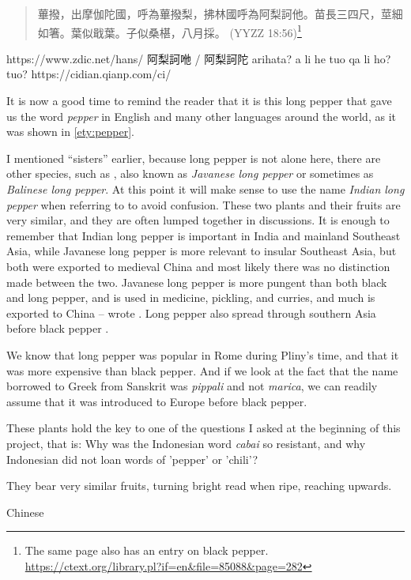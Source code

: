 \begin{quote}
    蓽撥，出摩伽陀國，呼為蓽撥梨，拂林國呼為阿梨訶他。苗長三四尺，莖細如箸。葉似戢葉。子似桑椹，八月採。 (YYZZ 18:56)\footnote{The same page also has an entry on black pepper. \url{https://ctext.org/library.pl?if=en&file=85088&page=282}}
\end{quote}

https://www.zdic.net/hans/%
阿梨訶咃 / 阿梨訶陀 arihata?
a li he tuo
qa li ho? tuo?
https://cidian.qianp.com/ci/%

It is now a good time to remind the reader that it is this long pepper that gave us the word \textit{pepper} in English and many other languages around the world, as it was shown in \ref{ety:pepper}. 

I mentioned ``sisters'' earlier, because long pepper is not alone here, there are other species, such as , also known as \textit{Javanese long pepper} or sometimes as \textit{Balinese long pepper}. At this point it will make sense to use the name \textit{Indian long pepper} when referring to  to avoid confusion. These two plants and their fruits are very similar, and they are often lumped together in discussions. It is enough to remember that Indian long pepper is important in India and mainland Southeast Asia, while Javanese long pepper is more relevant to insular Southeast Asia, but both were exported to medieval China and most likely there was no distinction made between the two. Javanese long pepper is more pungent than both black and long pepper, and is used in medicine, pickling, and curries, and much is exported to China -- wrote \textcite{burkill_dictionary_1935}. Long pepper also spread through southern Asia before black pepper \parencite[1746-1751]{burkill_dictionary_1935}. 

We know that long pepper was popular in Rome during Pliny's time, and that it was more expensive than black pepper. And if we look at the fact that the name borrowed to Greek from Sanskrit was \textit{pippali} and not \textit{marica}, we can readily assume that it was introduced to Europe before black pepper.

These plants hold the key to one of the questions I asked at the beginning of this project, that is: Why was the Indonesian word \textit{cabai} so resistant, and why Indonesian did not loan words of 'pepper' or 'chili'?  


They bear very similar fruits, turning bright read when ripe, reaching upwards.  



Chinese
